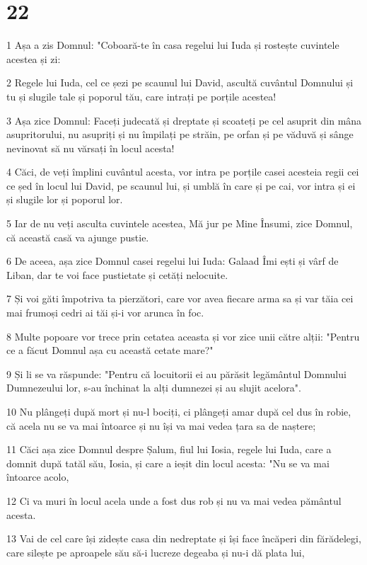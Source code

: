\chapter{22}

\par 1 Așa a zis Domnul: "Coboară-te în casa regelui lui Iuda și rostește cuvintele acestea și zi:
\par 2 Regele lui Iuda, cel ce șezi pe scaunul lui David, ascultă cuvântul Domnului și tu și slugile tale și poporul tău, care intrați pe porțile acestea!
\par 3 Așa zice Domnul: Faceți judecată și dreptate și scoateți pe cel asuprit din mâna asupritorului, nu asupriți și nu împilați pe străin, pe orfan și pe văduvă și sânge nevinovat să nu vărsați în locul acesta!
\par 4 Căci, de veți împlini cuvântul acesta, vor intra pe porțile casei acesteia regii cei ce șed în locul lui David, pe scaunul lui, și umblă în care și pe cai, vor intra și ei și slugile lor și poporul lor.
\par 5 Iar de nu veți asculta cuvintele acestea, Mă jur pe Mine Însumi, zice Domnul, că această casă va ajunge pustie.
\par 6 De aceea, așa zice Domnul casei regelui lui Iuda: Galaad Îmi ești și vârf de Liban, dar te voi face pustietate și cetăți nelocuite.
\par 7 Și voi găti împotriva ta pierzători, care vor avea fiecare arma sa și var tăia cei mai frumoși cedri ai tăi și-i vor arunca în foc.
\par 8 Multe popoare vor trece prin cetatea aceasta și vor zice unii către alții: "Pentru ce a făcut Domnul așa cu această cetate mare?"
\par 9 Și li se va răspunde: "Pentru că locuitorii ei au părăsit legământul Domnului Dumnezeului lor, s-au închinat la alți dumnezei și au slujit acelora".
\par 10 Nu plângeți după mort și nu-l bociți, ci plângeți amar după cel dus în robie, că acela nu se va mai întoarce și nu își va mai vedea țara sa de naștere;
\par 11 Căci așa zice Domnul despre Șalum, fiul lui Iosia, regele lui Iuda, care a domnit după tatăl său, Iosia, și care a ieșit din locul acesta: "Nu se va mai întoarce acolo,
\par 12 Ci va muri în locul acela unde a fost dus rob și nu va mai vedea pământul acesta.
\par 13 Vai de cel care își zidește casa din nedreptate și își face încăperi din fărădelegi, care silește pe aproapele său să-i lucreze degeaba și nu-i dă plata lui,
